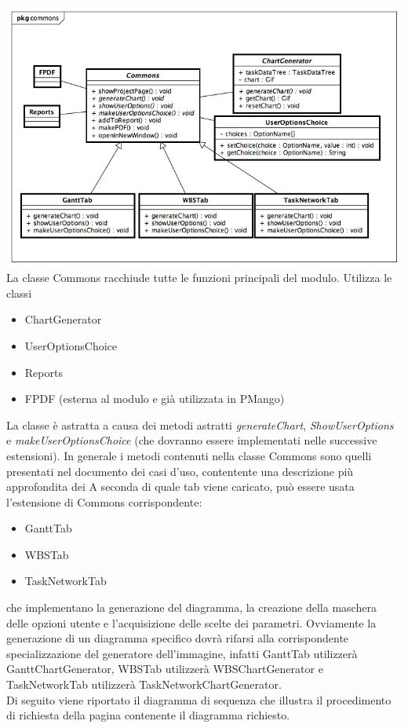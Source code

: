 \documentclass[a4paper, 12pt]{report}
\begin{document}
\includegraphics[width=\textwidth]{chart/Commons.png}
La classe Commons racchiude tutte le funzioni principali del modulo. Utilizza le classi
\begin{itemize}
	\item ChartGenerator
	\item UserOptionsChoice
	\item Reports
	\item FPDF (esterna al modulo e gi\`a utilizzata in PMango)
\end{itemize}
La classe \`e astratta a causa dei metodi astratti \emph{generateChart}, \emph{ShowUserOptions} e \emph{makeUserOptionsChoice} (che dovranno essere implementati nelle successive estensioni). In generale i metodi contenuti nella classe Commons sono quelli presentati nel documento dei casi d'uso, contentente una descrizione pi\`u approfondita dei
A seconda di quale tab viene caricato, pu\`o essere usata l'estensione di Commons corrispondente: 
\begin{itemize}
	\item GanttTab
	\item WBSTab
	\item TaskNetworkTab
\end{itemize}
che implementano la generazione del diagramma, la creazione della maschera delle opzioni utente e l'acquisizione delle scelte dei parametri. Ovviamente la generazione di un diagramma specifico dovr\`a rifarsi alla corrispondente specializzazione del generatore dell'immagine, infatti GanttTab utilizzer\`a GanttChartGenerator, WBSTab utilizzer\`a WBSChartGenerator e TaskNetworkTab utilizzer\`a TaskNetworkChartGenerator.\\
Di seguito viene riportato il diagramma di sequenza che illustra il procedimento di richiesta della pagina contenente il diagramma richiesto.
\end{document}
